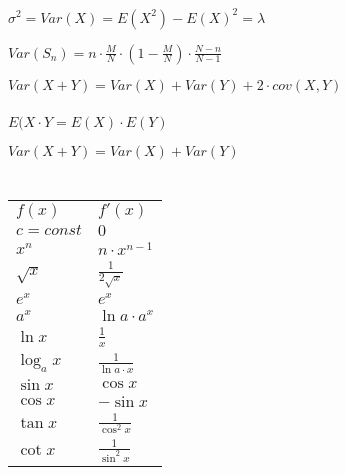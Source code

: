 \documentclass[10pt,a4paper,landscape]{article}
\begin{document}
\begin{multicols*}{4}
\noindent{}
\parbox{\columnwidth}{\centering $\sigma^2 = Var(X) = E(X^2) - E(X)^2 = \lambda$}

\noindent{}
\parbox{\columnwidth}{\centering $Var(S_n) = n \cdot \frac{M}{N} \cdot (1 - \frac{M}{N}) \cdot \frac{N-n}{N-1}$}

\noindent{}
\parbox{\columnwidth}{\centering $Var(X + Y) = Var(X) + Var(Y) + 2 \cdot cov(X,Y)$}

\subsubsection{\noindent{}}

\noindent{}
\parbox{\columnwidth}{\centering $E(X \cdot Y = E(X) \cdot E(Y)$}
\parbox{\columnwidth}{\centering $Var(X + Y) = Var(X) + Var(Y)$}

\section{\noindent{}}
\subsection{\noindent{}}

\noindent{}
\def\arraystretch{1.5}%
\begin{tabularx}{\columnwidth}{|X|X|}
\cline{1-2}
$f(x)$&$f'(x)$\\ 
\cline{1-2}
$c = const$&$0$\\
\cline{1-2}
$x^n$&$n \cdot x^{n-1}$\\
\cline{1-2}
$\sqrt{x}$&$\frac{1}{2\sqrt{x}}$\\
\cline{1-2}
$e^x$&$e^x$\\
\cline{1-2}
$a^x$&$\ln a \cdot a^x$\\
\cline{1-2}
$\ln x$&$\frac{1}{x}$\\
\cline{1-2}
$\log_a x$&$\frac{1}{\ln  a \cdot x}$\\
\cline{1-2}
$\sin{x}$&$\cos{x}$\\
\cline{1-2}
$\cos{x}$&$-\sin{x}$\\
\cline{1-2}
$\tan{x}$&$\frac{1}{\cos^2{x}}$\\
\cline{1-2}
$\cot{x}$&$\frac{1}{\sin^2{x}}$\\
\cline{1-2}
\end{tabularx}


\end{multicols*}
\end{document}
